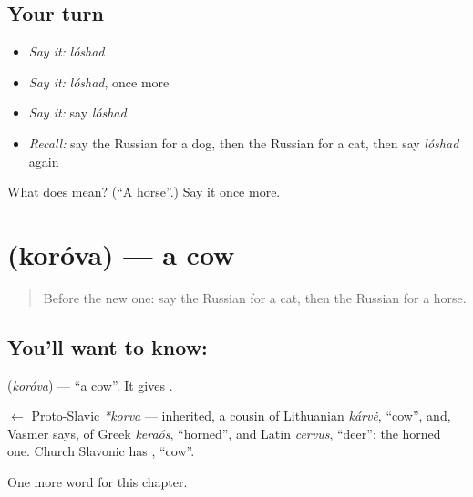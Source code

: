 \subsection*{Your turn}
\begin{itemize}
\raggedright
  \item \emph{Say it:} \emph{lóshad}
  \item \emph{Say it:} \emph{lóshad}, once more
  \item \emph{Say it:} say \emph{lóshad}
  \item \emph{Recall:} say the Russian for a dog, then the Russian for a cat, then say \emph{lóshad} again
\end{itemize}

\begin{tcolorbox}[breakable,colback=teal!4,colframe=teal!35!black,title={Before you move on}]
What does  mean? (\textquotedblleft{}A horse\textquotedblright{}.) Say it once more.
\end{tcolorbox}
\section[\texorpdfstring{\ru{корова} (koróva)}{корова (koróva)}]{ (koróva) — a cow}

\label{lesson:RU-C60-cow}



\begin{quote}
Before the new one: say the Russian for a cat, then the Russian for a horse.
\end{quote}

\subsection*{You'll want to know: }
\textbf{} (\emph{koróva}) — \textquotedblleft{}a cow\textquotedblright{}. It gives \textbf{}.

\begin{cousinweb}
\textbf{} $\leftarrow$ Proto-Slavic \emph{*korva} — inherited, a cousin of Lithuanian \emph{kárvė}, \textquotedblleft{}cow\textquotedblright{}, and, Vasmer says, of Greek \emph{keraós}, \textquotedblleft{}horned\textquotedblright{}, and Latin \emph{cervus}, \textquotedblleft{}deer\textquotedblright{}: the horned one. Church Slavonic has \emph{}, \textquotedblleft{}cow\textquotedblright{}.
\end{cousinweb}

\begin{grammarlens}[title={What you've built}]
One more word for this chapter.
\end{grammarlens}

